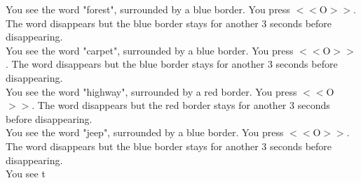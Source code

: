 \documentclass[pdflatex,sn-nature]{sn-jnl}%
\theoremstyle{thmstyleone}%
\theoremstyle{thmstyletwo}%
\theoremstyle{thmstylethree}%
\begin{document}
You see the word "forest", surrounded by a blue border. You press $<<$O$>>$. The word disappears but the blue border stays for another 3 seconds before disappearing. $~$\\ 
You see the word "carpet", surrounded by a blue border. You press $<<$O$>>$. The word disappears but the blue border stays for another 3 seconds before disappearing. $~$\\ 
You see the word "highway", surrounded by a red border. You press $<<$O$>>$. The word disappears but the red border stays for another 3 seconds before disappearing. $~$\\ 
You see the word "jeep", surrounded by a blue border. You press $<<$O$>>$. The word disappears but the blue border stays for another 3 seconds before disappearing. $~$\\ 
You see t 
\end{document}
